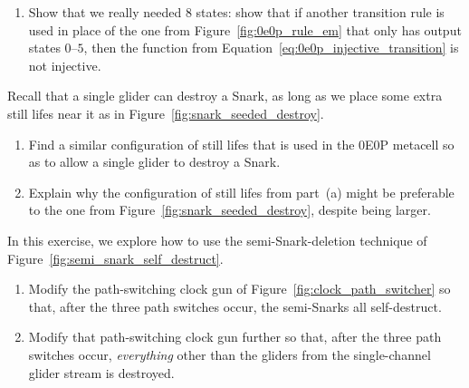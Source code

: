 \begin{multicols}{2}
\begin{problem}
\begin{enumerate}[label=\bf\color{ocre}(\alph*)]
			\item Show that we really needed $8$ states: show that if another transition rule is used in place of the one from Figure~\ref{fig:0e0p_rule_em} that only has output states $0$--$5$, then the function from Equation~\eqref{eq:0e0p_injective_transition} is not injective.
		\end{enumerate}
	\end{problem}
	
	
	\mfilbreak
	
	
	\begin{problemstar}\label{exer:0e0p_snark_destroyer} 
		Recall that a single glider can destroy a Snark, as long as we place some extra still lifes near it as in Figure~\ref{fig:snark_seeded_destroy}.\smallskip
		
		\begin{enumerate}[label=\bf\color{ocre}(\alph*)]
			\item Find a similar configuration of still lifes that is used in the 0E0P metacell so as to allow a single glider to destroy a Snark.
			
			\item Explain why the configuration of still lifes from part~(a) might be preferable to the one from Figure~\ref{fig:snark_seeded_destroy}, despite being larger.
		\end{enumerate}
	\end{problemstar}


	\mfilbreak
	
	
	\begin{problem}\label{exer:0e0p_clock_gun_destroy}
	In this exercise, we explore how to use the semi-Snark-deletion technique of Figure~\ref{fig:semi_snark_self_destruct}.\smallskip
	
	\begin{enumerate}[label=\bf\color{ocre}(\alph*)]
		\item {} Modify the path-switching clock gun of Figure~\ref{fig:clock_path_switcher} so that, after the three path switches occur, the semi-Snarks all self-destruct.
		
		\item {} Modify that path-switching clock gun further so that, after the three path switches occur, \emph{everything} other than the gliders from the single-channel glider stream is destroyed.
		

\end{enumerate}
\end{problem}
\end{multicols}
